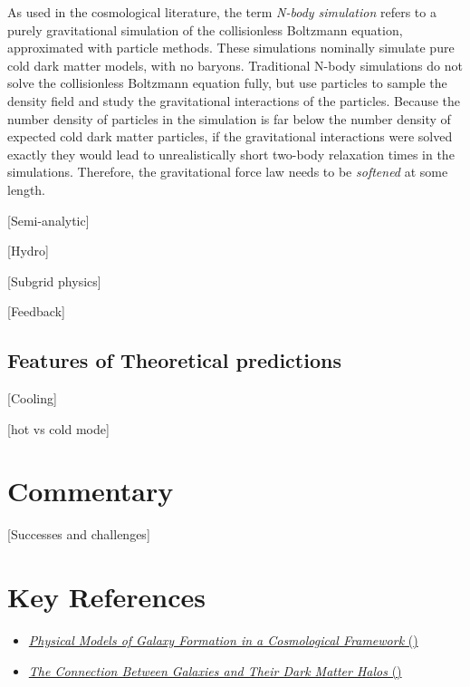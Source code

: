 As used in the cosmological literature, the term {\it N-body
simulation} refers to a purely gravitational simulation of the
collisionless Boltzmann equation, approximated with particle
methods. These simulations nominally simulate pure cold dark matter
models, with no baryons. Traditional N-body simulations do not solve
the collisionless Boltzmann equation fully, but use particles to
sample the density field and study the gravitational interactions of
the particles. Because the number density of particles in the
simulation is far below the number density of expected cold dark
matter particles, if the gravitational interactions were solved
exactly they would lead to unrealistically short two-body relaxation
times in the simulations. Therefore, the gravitational force law needs
to be {\it softened} at some length. 

[Semi-analytic]

[Hydro]

[Subgrid physics]

[Feedback]

\subsection{Features of Theoretical predictions}

[Cooling]

[hot vs cold mode]

\section{Commentary}

[Successes and challenges]



\section{Key References}

\begin{itemize}
  \item
    \href{https://ui.adsabs.harvard.edu/abs/2015ARA%26A..53...51S/abstract}
    {{\it Physical Models of Galaxy Formation in a Cosmological
        Framework} (\citealt{somerville15a})}
  \item
    \href{https://ui.adsabs.harvard.edu/abs/2018ARA%26A..56..435W/abstract}
      {{\it The Connection Between Galaxies and Their Dark Matter
          Halos} (\citealt{wechsler18a})}
\end{itemize}

